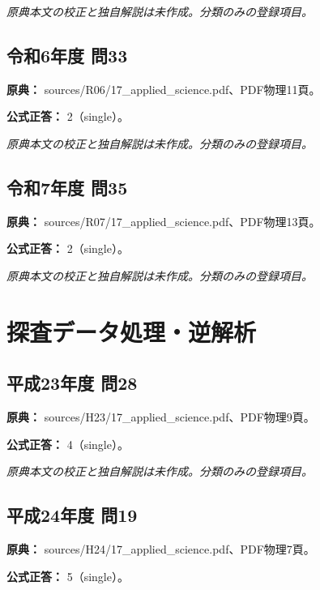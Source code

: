 \par\textit{原典本文の校正と独自解説は未作成。分類のみの登録項目。}

\subsection{令和6年度 問33}
\label{q:r06-reg-applied-33}

\noindent\textbf{原典：} sources/R06/17\_applied\_science.pdf、PDF物理11頁。

\textbf{公式正答：} 2（single）。

\par\textit{原典本文の校正と独自解説は未作成。分類のみの登録項目。}

\subsection{令和7年度 問35}
\label{q:r07-reg-applied-35}

\noindent\textbf{原典：} sources/R07/17\_applied\_science.pdf、PDF物理13頁。

\textbf{公式正答：} 2（single）。

\par\textit{原典本文の校正と独自解説は未作成。分類のみの登録項目。}

\section{探査データ処理・逆解析}

\subsection{平成23年度 問28}
\label{q:h23-reg-applied-28}

\noindent\textbf{原典：} sources/H23/17\_applied\_science.pdf、PDF物理9頁。

\textbf{公式正答：} 4（single）。

\par\textit{原典本文の校正と独自解説は未作成。分類のみの登録項目。}

\subsection{平成24年度 問19}
\label{q:h24-reg-applied-19}

\noindent\textbf{原典：} sources/H24/17\_applied\_science.pdf、PDF物理7頁。

\textbf{公式正答：} 5（single）。

